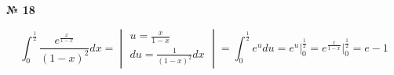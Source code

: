 \documentclass{article}
\begin{document}
\textbf{№ 18} 

\begingroup

\Large

$$ \int_{0}^{\frac{1}{2}} \frac{e^{\frac{x}{1-x}}}{(1-x)^2} dx 
= \begin{vmatrix} u = \frac{x}{1-x} \\ 
                 du = \frac{1}{(1-x)^2}dx \end{vmatrix}
= \int_{0}^{\frac{1}{2}} e^{u} du
= e^u \bigg\vert_{0}^{\frac{1}{2}}
= e^\frac{x}{1-x} \bigg\vert_{0}^{\frac{1}{2}}
= e - 1$$

\endgroup
\end{document}

